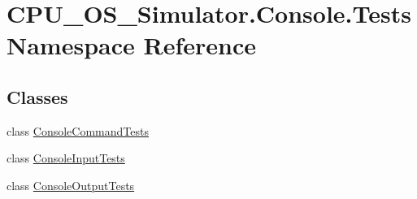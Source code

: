 \hypertarget{namespace_c_p_u___o_s___simulator_1_1_console_1_1_tests}{}\section{C\+P\+U\+\_\+\+O\+S\+\_\+\+Simulator.\+Console.\+Tests Namespace Reference}
\label{namespace_c_p_u___o_s___simulator_1_1_console_1_1_tests}
\subsection*{Classes}
\begin{DoxyCompactItemize}
\item 
class \hyperlink{class_c_p_u___o_s___simulator_1_1_console_1_1_tests_1_1_console_command_tests}{Console\+Command\+Tests}
\item 
class \hyperlink{class_c_p_u___o_s___simulator_1_1_console_1_1_tests_1_1_console_input_tests}{Console\+Input\+Tests}
\item 
class \hyperlink{class_c_p_u___o_s___simulator_1_1_console_1_1_tests_1_1_console_output_tests}{Console\+Output\+Tests}
\end{DoxyCompactItemize}
